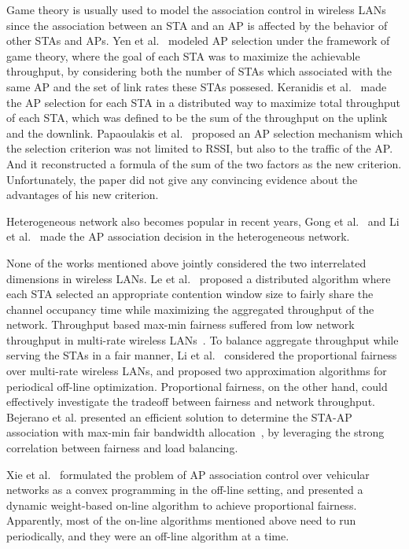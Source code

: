 \documentclass[conference]{IEEEtran}
\begin{document}
  Game theory is usually used to model the association control in wireless LANs since the association between an STA and an AP is affected by the behavior of other STAs and APs.  Yen et al.~\cite{Yen:2011} modeled AP selection under the framework of game theory, where the goal of each STA was to maximize the achievable throughput, by considering both the number of STAs which associated with the same AP and the set of link rates these STAs possesed.  Keranidis et al.~\cite{Keranidis:2011} made the AP selection for each STA in a distributed way to maximize total throughput of each STA, which was defined to be the sum of the throughput on the uplink and the downlink. Papaoulakis et al.~\cite{Papaoulakis:2008} proposed an AP selection mechanism which the selection criterion was not limited to RSSI, but also to the traffic of the AP.  And it reconstructed a formula of the sum of the two factors as the new criterion.  Unfortunately, the paper did not give any convincing evidence about the advantages of his new criterion.

  Heterogeneous network also becomes popular in recent years, Gong et al.~\cite{gong2012ap} and Li et al.~\cite{li2012optimal} made the AP association decision in the heterogeneous network.

  None of the works mentioned above jointly considered the two interrelated dimensions in wireless LANs. Le et al.~\cite{le2012maximizing} proposed a distributed algorithm where each STA selected an appropriate contention window size to fairly share the channel occupancy time while maximizing the aggregated throughput of the network.  Throughput based max-min fairness suffered from low network throughput in multi-rate wireless LANs~\cite{Bejerano:2004}.  To balance aggregate throughput while serving the STAs in a fair manner, Li et al.~\cite{Li:2008} considered the proportional fairness over multi-rate wireless LANs, and proposed two approximation algorithms for periodical off-line optimization.  Proportional fairness, on the other hand, could effectively investigate the tradeoff between fairness and network throughput.  Bejerano et al. presented an efficient solution to determine the STA-AP association with max-min fair bandwidth allocation~\cite{Bejerano:2004}, by leveraging the strong correlation between fairness and load balancing.

  Xie et al.~\cite{Lei:2009} formulated the problem of AP association control over vehicular networks as a convex programming in the off-line setting, and presented a dynamic weight-based on-line algorithm to achieve proportional fairness.  Apparently, most of the on-line algorithms mentioned above need to run periodically, and they were an off-line algorithm at a time.
\end{document}
